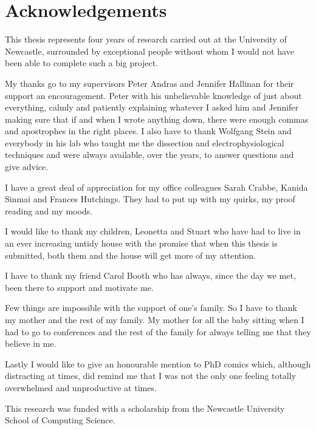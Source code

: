 \chapter{Acknowledgements}
\label{chap:acknowledgements}

This thesis represents four years of research carried out at the University of Newcastle, surrounded by exceptional people without whom I would not have been able to complete such a big project.

My thanks go to my supervisors Peter Andras and Jennifer Hallinan for their support an encouragement. Peter with his unbelievable knowledge of just about everything, calmly and patiently explaining whatever I asked him and Jennifer making sure that if and when I wrote anything down, there were enough commas and apostrophes in the right places. I also have to thank Wolfgang Stein and everybody in his lab who taught me the dissection and electrophysiological techniques and were always available, over the years, to answer questions and give advice.

I have a great deal of appreciation for my office colleagues Sarah Crabbe, Kanida Sinmai and Frances Hutchings. They had to put up with my quirks, my proof reading and my moods. 

I would like to thank my children, Leonetta and Stuart who have had to live in an ever increasing untidy house with the promise that when this thesis is submitted, both them and the house will get more of my attention.

I have to thank my friend Carol Booth who has always, since the day we met, been there to support and motivate me.

Few things are impossible with the support of one's family. So I have to thank my mother and the rest of my family. My mother for all the baby sitting when I had to go to conferences and the rest of the family for always telling me that they believe in me.

Lastly I would like to give an honourable mention to PhD comics which, although distracting at times, did remind me that I was not the only one feeling totally overwhelmed and unproductive at times. 

This research was funded with a scholarship from the Newcastle University School of Computing Science.

